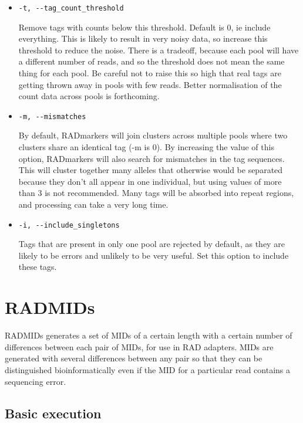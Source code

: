 \documentclass[a4paper]{article}
\begin{document}
\begin{itemize}
    \item \verb|-t, --tag_count_threshold|
    
    Remove tags with counts below this threshold. Default is 0, ie include everything. This is likely to result in very noisy data, so increase this threshold to reduce the noise. There is a tradeoff, because each pool will have a different number of reads, and so the threshold does not mean the same thing for each pool. Be careful not to raise this so high that real tags are getting thrown away in pools with few reads. Better normalisation of the count data across pools is forthcoming.
    
    \item \verb|-m, --mismatches|
    
    By default, RADmarkers will join clusters across multiple pools where two clusters share an identical tag (-m is 0). By increasing the value of this option, RADmarkers will also search for mismatches in the tag sequences. This will cluster together many alleles that otherwise would be separated because they don't all appear in one individual, but using values of more than 3 is not recommended. Many tags will be absorbed into repeat regions, and processing can take a very long time.
    
    \item \verb|-i, --include_singletons|
    
    Tags that are present in only one pool are rejected by default, as they are likely to be errors and unlikely to be very useful. Set this option to include these tags.
    
\end{itemize}

\section{RADMIDs}

RADMIDs generates a set of MIDs of a certain length with a certain number of differences between each pair of MIDs, for use in RAD adapters. MIDs are generated with several differences between any pair so that they can be distinguished bioinformatically even if the MID for a particular read contains a sequencing error.

\subsection{Basic execution}
\end{document}

